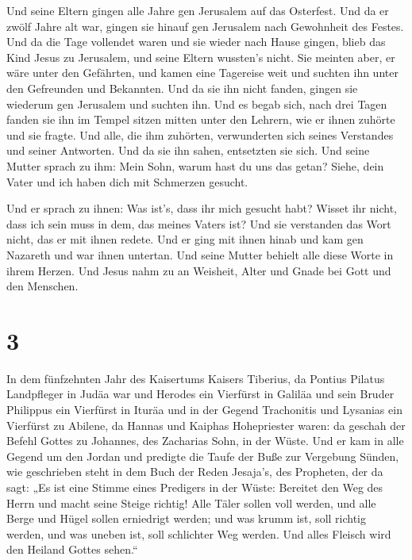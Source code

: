  Und seine Eltern gingen alle Jahre gen Jerusalem auf das
Osterfest.  Und da er zwölf Jahre alt war, gingen sie
hinauf gen Jerusalem nach Gewohnheit des Festes.  Und da
die Tage vollendet waren und sie wieder nach Hause gingen, blieb das
Kind Jesus zu Jerusalem, und seine Eltern wussten's nicht.
 Sie meinten aber, er wäre unter den Gefährten, und kamen
eine Tagereise weit und suchten ihn unter den Gefreunden und Bekannten.
 Und da sie ihn nicht fanden, gingen sie wiederum gen
Jerusalem und suchten ihn.  Und es begab sich, nach drei
Tagen fanden sie ihn im Tempel sitzen mitten unter den Lehrern, wie er
ihnen zuhörte und sie fragte.  Und alle, die ihm
zuhörten, verwunderten sich seines Verstandes und seiner Antworten.
 Und da sie ihn sahen, entsetzten sie sich. Und seine
Mutter sprach zu ihm: Mein Sohn, warum hast du uns das getan? Siehe,
dein Vater und ich haben dich mit Schmerzen gesucht.

 Und er sprach zu ihnen: Was ist's, dass ihr mich gesucht
habt? Wisset ihr nicht, dass ich sein muss in dem, das meines Vaters
ist?  Und sie verstanden das Wort nicht, das er mit ihnen
redete.  Und er ging mit ihnen hinab und kam gen Nazareth
und war ihnen untertan. Und seine Mutter behielt alle diese Worte in
ihrem Herzen.  Und Jesus nahm zu an Weisheit, Alter und
Gnade bei Gott und den Menschen.

\hypertarget{section-2}{%
\section{3}\label{section-2}}

 In dem fünfzehnten Jahr des Kaisertums Kaisers Tiberius,
da Pontius Pilatus Landpfleger in Judäa war und Herodes ein Vierfürst in
Galiläa und sein Bruder Philippus ein Vierfürst in Ituräa und in der
Gegend Trachonitis und Lysanias ein Vierfürst zu Abilene, 
da Hannas und Kaiphas Hohepriester waren: da geschah der Befehl Gottes
zu Johannes, des Zacharias Sohn, in der Wüste.  Und er kam
in alle Gegend um den Jordan und predigte die Taufe der Buße zur
Vergebung Sünden,  wie geschrieben steht in dem Buch der
Reden Jesaja's, des Propheten, der da sagt: „Es ist eine Stimme eines
Predigers in der Wüste: Bereitet den Weg des Herrn und macht seine
Steige richtig!  Alle Täler sollen voll werden, und alle
Berge und Hügel sollen erniedrigt werden; und was krumm ist, soll
richtig werden, und was uneben ist, soll schlichter Weg werden.
 Und alles Fleisch wird den Heiland Gottes sehen.``

